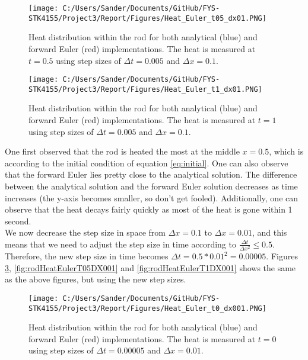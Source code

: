 \documentclass[12pt,a4paper]{article}
\begin{document}
\begin{figure}[H]
\centering
\texttt{[image: C:/Users/Sander/Documents/GitHub/FYS-STK4155/Project3/Report/Figures/Heat\_Euler\_t05\_dx01.PNG]}
\caption{\label{fig:rodHeatEulerT05DX01} Heat distribution within the rod for both analytical (blue) and forward Euler (red) implementations. The heat is measured at $t = 0.5$ using step sizes of $\Delta t = 0.005$ and $\Delta x = 0.1$.}
\end{figure}

\begin{figure}[H]
\centering
\texttt{[image: C:/Users/Sander/Documents/GitHub/FYS-STK4155/Project3/Report/Figures/Heat\_Euler\_t1\_dx01.PNG]}
\caption{\label{fig:rodHeatEulerT1DX01} Heat distribution within the rod for both analytical (blue) and forward Euler (red) implementations. The heat is measured at $t = 1$ using step sizes of $\Delta t = 0.005$ and $\Delta x = 0.1$.}
\end{figure}

\noindent One first observed that the rod is heated the most at the middle $x = 0.5$, which is according to the initial condition of equation \ref{eq:initial}. One can also observe that the forward Euler lies pretty close to the analytical solution. The difference between the analytical solution and the forward Euler solution decreases as time increases (the y-axis becomes smaller, so don't get fooled). Additionally, one can observe that the heat decays fairly quickly as most of the heat is gone within 1 second. 
\\
We now decrease the step size in space from $\Delta x = 0.1$ to $\Delta x = 0.01$, and this means that we need to adjust the step size in time according to $\frac{\Delta t}{\Delta x^2} \leq 0.5$. Therefore, the new step size in time becomes $\Delta t = 0.5*0.01^2 = 0.00005$. Figures \ref{fig:rodHeatEulerT0DX001}, \ref{fig:rodHeatEulerT05DX001} and \ref{fig:rodHeatEulerT1DX001} shows the same as the above figures, but using the new step sizes.

\begin{figure}[H]
\centering
\texttt{[image: C:/Users/Sander/Documents/GitHub/FYS-STK4155/Project3/Report/Figures/Heat\_Euler\_t0\_dx001.PNG]}
\caption{\label{fig:rodHeatEulerT0DX001} Heat distribution within the rod for both analytical (blue) and forward Euler (red) implementations. The heat is measured at $t = 0$ using step sizes of $\Delta t = 0.00005$ and $\Delta x = 0.01$.}
\end{figure}
\end{document}
